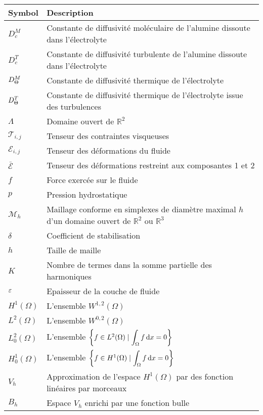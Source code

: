 \begin{tabularx}{\textwidth}{@{}ll@{}}
  \toprule
  Symbol & Description \\
  \midrule
  $D_c^M$ & Constante de diffusivité moléculaire de l'alumine dissoute dans l'électrolyte\\
  $D_c^T$ & Constante de diffusivité turbulente de l'alumine dissoute dans l'électrolyte\\
  $D_\Theta^M$ & Constante de diffusivité thermique de l'électrolyte\\
  $D_\Theta^T$ & Constante de diffusivité thermique de l'électrolyte issue des turbulences\\
  $\Lambda$ & Domaine ouvert de $\mathbb R^2$\\
  $\mathcal T_{i,j}$ & Tenseur des contraintes visqueuses \\
  $\mathcal E_{i,j}$ & Tenseur des déformations du fluide \\
  $\bar{\mathcal E}$ & Tenseur des déformations restreint aux composantes 1 et 2 \\
  $f$ & Force exercée sur le fluide \\
  $p$ & Pression hydrostatique \\
  $\mathcal M_h$ & Maillage conforme en simplexes de diamètre maximal $h$ d'un domaine ouvert de $\mathbb R^2$ ou $\mathbb R^3$\\
  $\delta$ & Coefficient de stabilisation \\
  $h$ & Taille de maille \\
  $K$ & Nombre de termes dans la somme partielle des harmoniques \\
  $\varepsilon$ & Epaisseur de la couche de fluide \\
  $H^1(\Omega)$ & L'ensemble $W^{1, 2}(\Omega)$\\
  $L^2(\Omega)$ & L'ensemble $W^{0, 2}(\Omega)$\\
  $L^2_0(\Omega)$ & L'ensemble $\left\{ f \in L^2(\Omega) \mid \displaystyle\int_\Omega f\,\mathrm dx = 0 \right\}$\\
  $H^1_0(\Omega)$ & L'ensemble $\left\{ f \in H^1(\Omega) \mid \displaystyle\int_\Omega f\,\mathrm dx = 0 \right\}$\\
  $V_h$ & Approximation de l'espace $H^1(\Omega)$ par des fonction linéaires par morceaux\\
  $B_h$ & Espace $V_h$ enrichi par une fonction bulle\\
  \bottomrule
\end{tabularx}
